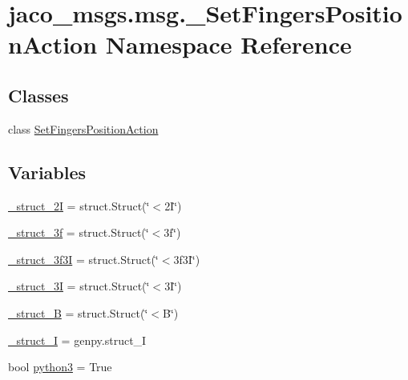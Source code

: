 \hypertarget{namespacejaco__msgs_1_1msg_1_1__SetFingersPositionAction}{}\section{jaco\+\_\+msgs.\+msg.\+\_\+\+Set\+Fingers\+Position\+Action Namespace Reference}
\label{namespacejaco__msgs_1_1msg_1_1__SetFingersPositionAction}
\subsection*{Classes}
\begin{DoxyCompactItemize}
\item 
class \hyperlink{classjaco__msgs_1_1msg_1_1__SetFingersPositionAction_1_1SetFingersPositionAction}{Set\+Fingers\+Position\+Action}
\end{DoxyCompactItemize}
\subsection*{Variables}
\begin{DoxyCompactItemize}
\item 
\hyperlink{namespacejaco__msgs_1_1msg_1_1__SetFingersPositionAction_aae5350c97a6814d371d240b022519fa9}{\+\_\+struct\+\_\+2I} = struct.\+Struct(\char`\"{}$<$2\+I\char`\"{})
\item 
\hyperlink{namespacejaco__msgs_1_1msg_1_1__SetFingersPositionAction_ae7fae0eceedf4784bf5b1d909f6f3738}{\+\_\+struct\+\_\+3f} = struct.\+Struct(\char`\"{}$<$3f\char`\"{})
\item 
\hyperlink{namespacejaco__msgs_1_1msg_1_1__SetFingersPositionAction_a3c777870434f39f8855ac25c4d1cdd15}{\+\_\+struct\+\_\+3f3I} = struct.\+Struct(\char`\"{}$<$3f3\+I\char`\"{})
\item 
\hyperlink{namespacejaco__msgs_1_1msg_1_1__SetFingersPositionAction_a3c9840baa03996f17de575764fd61109}{\+\_\+struct\+\_\+3I} = struct.\+Struct(\char`\"{}$<$3\+I\char`\"{})
\item 
\hyperlink{namespacejaco__msgs_1_1msg_1_1__SetFingersPositionAction_a31453a923499c485d6d6bd7cfc5f054e}{\+\_\+struct\+\_\+B} = struct.\+Struct(\char`\"{}$<$B\char`\"{})
\item 
\hyperlink{namespacejaco__msgs_1_1msg_1_1__SetFingersPositionAction_ac588686576e023e5eff8543b94f1eaab}{\+\_\+struct\+\_\+I} = genpy.\+struct\+\_\+I
\item 
bool \hyperlink{namespacejaco__msgs_1_1msg_1_1__SetFingersPositionAction_a575384c5095af8e820fdb8f3c5965102}{python3} = True
\end{DoxyCompactItemize}


